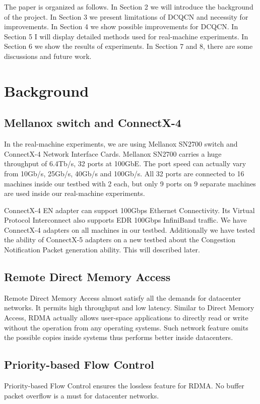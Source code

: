 \documentclass{article}
\begin{document}
The paper is organized as follows.
In Section 2 we will introduce the background of the project.
In Section 3 we present limitations of DCQCN and necessity for improvements.
In Section 4 we show possible improvements for DCQCN.
In Section 5 I will display detailed methods used for real-machine experiments.
In Section 6 we show the results of experiments.
In Section 7 and 8, there are some discussions and future work.

\section{Background}
\subsection{Mellanox switch and ConnectX-4}
In the real-machine experiments, we are using Mellanox SN2700 switch and ConnectX-4 Network Interface Cards.
Mellanox SN2700 carries a huge throughput of 6.4Tb/s, 32 ports at 100GbE.
The port speed can actually vary from 10Gb/s, 25Gb/s, 40Gb/s and 100Gb/s.
All 32 ports are connected to 16 machines inside our testbed with 2 each, but only 9 ports on 9 separate machines are used inside our
real-machine experiments.

ConnectX-4 EN adapter can support 100Gbps Ethernet Connectivity.
Its Virtual Protocol Interconnect also supports EDR 100Gbps InfiniBand traffic.
We have ConnectX-4 adapters on all machines in our testbed.
Additionally we have tested the ability of ConnectX-5 adapters on a new testbed about the Congestion Notification Packet generation
ability.
This will described later.

\subsection{Remote Direct Memory Access}
Remote Direct Memory Access almost satisfy all the demands for datacenter networks.
It permits high throughput and low latency.
Similar to Direct Memory Access, RDMA actually allows user-space applications to directly read or write without the operation from
any operating systems.
Such network feature omits the possible copies inside systems thus performs better inside datacenters.

\subsection{Priority-based Flow Control}
Priority-based Flow Control ensures the lossless feature for RDMA.
No buffer packet overflow is a must for datacenter networks.
\end{document}
